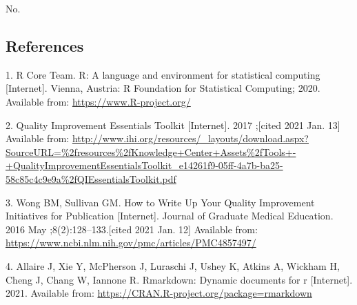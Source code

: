 \documentclass[
]{article}
\newlength{\cslhangindent}
\newenvironment{CSLReferences}[2] %
 {%
  \setlength{\parindent}{0pt}
  \ifodd #1 \everypar{\setlength{\hangindent}{\cslhangindent}}\ignorespaces\fi
  \ifnum #2 > 0
  \setlength{\parskip}{#2\baselineskip}
  \fi
 }%
 {}
\begin{document}
No.~

\hypertarget{references}{%
\subsection*{References}\label{references}}

\hypertarget{refs}{}
\begin{CSLReferences}{0}{0}
\leavevmode{}%
1. R Core Team. R: A language and environment for statistical computing {[}Internet{]}. Vienna, Austria: R Foundation for Statistical Computing; 2020. Available from: \url{https://www.R-project.org/}

\leavevmode{}%
2. Quality {Improvement} {Essentials} {Toolkit} {[}Internet{]}. 2017 ;{[}cited 2021 Jan. 13{]} Available from: \url{http://www.ihi.org/resources/_layouts/download.aspx?SourceURL=\%2fresources\%2fKnowledge+Center+Assets\%2fTools+-+QualityImprovementEssentialsToolkit_e14261f9-05ff-4a7b-ba25-58c85c4c9e9a\%2fQIEssentialsToolkit.pdf}

\leavevmode{}%
3. Wong BM, Sullivan GM. How to {Write} {Up} {Your} {Quality} {Improvement} {Initiatives} for {Publication} {[}Internet{]}. Journal of Graduate Medical Education. 2016 May ;8(2):128--133.{[}cited 2021 Jan. 12{]} Available from: \url{https://www.ncbi.nlm.nih.gov/pmc/articles/PMC4857497/}

\leavevmode{}%
4. Allaire J, Xie Y, McPherson J, Luraschi J, Ushey K, Atkins A, Wickham H, Cheng J, Chang W, Iannone R. Rmarkdown: Dynamic documents for r {[}Internet{]}. 2021. Available from: \url{https://CRAN.R-project.org/package=rmarkdown}

\end{CSLReferences}
\end{document}
